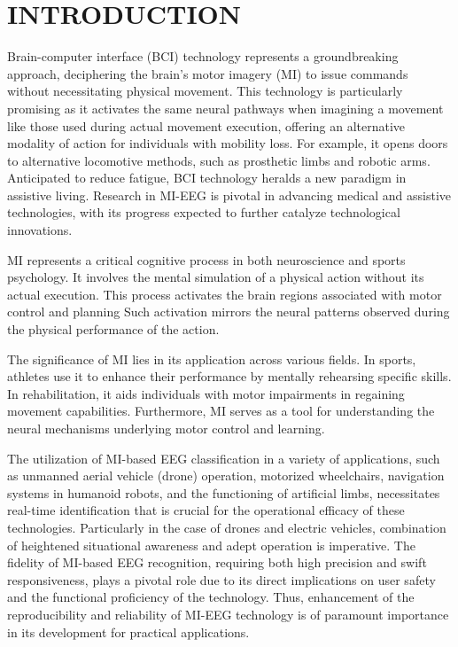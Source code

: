 \section{INTRODUCTION}
\label{sec:introduction}
Brain-computer interface (BCI) technology represents a groundbreaking approach, deciphering the brain's motor imagery (MI) to issue commands without necessitating physical movement\cite{benzy2020motor}. This technology is particularly promising as it activates the same neural pathways when imagining a movement like those used during actual movement execution, offering an alternative modality of action for individuals with mobility loss\cite{guillot2009brain}. For example, it opens doors to alternative locomotive methods, such as prosthetic limbs and robotic arms\cite{gupta2020prototype,korik2019decoding,cho2021neurograsp}. Anticipated to reduce fatigue, BCI technology heralds a new paradigm in assistive living\cite{lotze2006motor,mulder2007motor}. Research in MI-EEG is pivotal in advancing medical and assistive technologies, with its progress expected to further catalyze technological innovations.


MI represents a critical cognitive process in both neuroscience and sports psychology\cite{bovend2012practical,cryder2023guided}. It involves the mental simulation of a physical action without its actual execution. This process activates the brain regions associated with motor control and planning\cite{henschke2023engaging,munzert2009cognitive} Such activation mirrors the neural patterns observed during the physical performance of the action.

\vspace{3mm}

The significance of MI lies in its application across various fields. In sports, athletes use it to enhance their performance by mentally rehearsing specific skills\cite{cederstrom2021effect,app12199753}. In rehabilitation, it aids individuals with motor impairments in regaining movement capabilities. Furthermore, MI serves as a tool for understanding the neural mechanisms underlying motor control and learning\cite{tong2017motor, choy2023virtual}.

\vspace{3mm}
The utilization of MI-based EEG classification in a variety of applications,
such as unmanned aerial vehicle (drone) operation, motorized wheelchairs,
navigation systems in humanoid robots, and the functioning of artificial limbs,
necessitates real-time identification that is crucial for the operational efficacy
of these technologies\cite{zhang2018converting,chaudhary2020flexible,huang2019eeg,dumitrescu2021using}. Particularly in the case of drones and electric vehicles,
combination of heightened situational awareness and adept operation is
imperative\cite{liu2020parallel,freitas2019real}. The fidelity of MI-based EEG recognition, requiring both high precision and swift responsiveness, plays a pivotal role due to its direct implications on user safety and the functional proficiency of the technology\cite{liu2017identification}. Thus, enhancement of the reproducibility and reliability of MI-EEG technology is of paramount importance in its development for practical applications.


